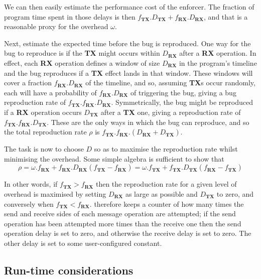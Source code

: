 We can then easily estimate the performance cost of the enforcer.  The
fraction of program time spent in those delays is then
$f_{\mathbf{TX}}.D_{\mathbf{TX}} + f_{\mathbf{RX}}.D_{\mathbf{RX}}$,
and that is a reasonable proxy for the overhead $\omega$.

Next, estimate the expected time before the bug is reproduced.  One
way for the bug to reproduce is if the \textbf{TX} might occurs within
$D_{\mathbf{RX}}$ after a \textbf{RX} operation.  In effect, each
\textbf{RX} operation defines a window of size $D_{\mathbf{RX}}$ in
the program's timeline and the bug reproduces if a \textbf{TX} effect
lands in that window.  These windows will cover a fraction
$f_{\mathbf{RX}}.D_{\mathbf{RX}}$ of the timeline, and so, assuming
\textbf{TX}s occur randomly, each will have a probability of
$f_{\mathbf{RX}}.D_{\mathbf{RX}}$ of triggering the bug, giving a bug
reproduction rate of
$f_{\mathbf{TX}}.f_{\mathbf{RX}}.D_{\mathbf{RX}}$.  Symmetrically, the
bug might be reproduced if a \textbf{RX} operation occurs
$D_{\mathbf{TX}}$ after a \textbf{TX} one, giving a reproduction rate
of $f_{\mathbf{TX}}.f_{\mathbf{RX}}.D_{\mathbf{TX}}$.  These are the
only ways in which the bug can reproduce, and so the total
reproduction rate $\rho$ is
$f_{\mathbf{TX}}.f_{\mathbf{RX}}.(D_{\mathbf{RX}} + D_{\mathbf{TX}})$.

The task is now to choose $D$ so as to maximise the reproduction
rate whilst minimising the overhead.  Some simple algebra is
sufficient to show that
\begin{displaymath}
\rho = {\omega}.f_{\mathbf{RX}} + f_{\mathbf{RX}}.D_{\mathbf{RX}}(f_{\mathbf{TX}} - f_{\mathbf{RX}}) = {\omega}.f_{\mathbf{TX}} + f_{\mathbf{TX}}.D_{\mathbf{TX}}(f_{\mathbf{RX}} - f_{\mathbf{TX}})
\end{displaymath}

In other words, if $f_{\mathbf{TX}} > f_{\mathbf{RX}}$ then the
reproduction rate for a given level of overhead is maximised by
setting $D_{\mathbf{RX}}$ as large as possible and $D_{\mathbf{TX}}$
to zero, and conversely when $f_{\mathbf{TX}} < f_{\mathbf{RX}}$.
{\Implementation} therefore keeps a counter of how many times the send
and receive sides of each message operation are attempted; if the send
operation has been attempted more times than the receive one then the
send operation delay is set to zero, and otherwise the receive delay
is set to zero.  The other delay is set to some user-configured
constant.

\subsection{Run-time considerations}

